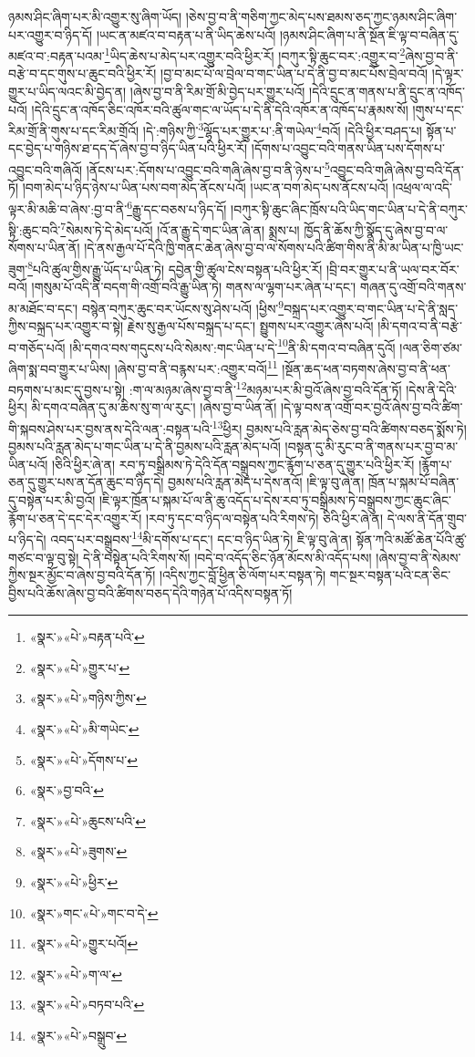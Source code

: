 ཉམས་ཤིང་ཞིག་པར་མི་འགྱུར་སུ་ཞིག་ཡོད། །ཅེས་བྱ་བ་ནི་གཅིག་ཀྱང་མེད་པས་ཐམས་ཅད་ཀྱང་ཉམས་ཤིང་ཞིག་པར་འགྱུར་བ་ཉིད་དོ། །ཡང་ན་མཛའ་བ་བརྟན་པ་ནི་ཡིད་ཆེས་པའོ། །ཉམས་ཤིང་ཞིག་པ་ནི་སྔོན་ཇི་ལྟ་བ་བཞིན་དུ་མཛའ་བ་:བརྟན་པའམ་\footnote{«སྣར་»«པེ་»བརྟན་པའི་}ཡིད་ཆེས་པ་མེད་པར་འགྱུར་བའི་ཕྱིར་རོ། །བཀུར་སྟི་ཆུང་བར་:འགྱུར་བ་\footnote{«སྣར་»«པེ་»གྱུར་པ་}ཞེས་བྱ་བ་ནི་བརྩེ་བ་དང་གུས་པ་ཆུང་བའི་ཕྱིར་རོ། །བྱ་བ་མང་པོ་ལ་བྲེལ་བ་གང་ཡིན་པ་དེ་ནི་བྱ་བ་མང་པོས་བྲེལ་བའོ། །དེ་ལྟར་གྱུར་པ་ཡིད་ལའང་མི་བྱེད་ན། །ཞེས་བྱ་བ་ནི་རིམ་གྲོ་མི་བྱེད་པར་གྱུར་པའོ། །དེའི་དྲུང་ན་གནས་པ་ནི་དྲུང་ན་འཁོད་པའོ། །དེའི་དྲུང་ན་འཁོད་ཅིང་འཁོར་བའི་ཚུལ་གང་ལ་ཡོད་པ་དེ་ནི་དེའི་འཁོར་ན་འཁོད་པ་རྣམས་སོ། །གུས་པ་དང་རིམ་གྲོ་ནི་གུས་པ་དང་རིམ་གྲོའོ། །དེ་:གཉིས་ཀྱི་\footnote{«སྣར་»«པེ་»གཉིས་ཀྱིས་}ལྷོད་པར་གྱུར་པ་:ནི་གཡེལ་\footnote{«སྣར་»«པེ་»མི་གཡེང་}བའོ། །དེའི་ཕྱིར་བཤད་པ། སྟོན་པ་དང་བྱེད་པ་གཉིས་ཐ་དད་དོ་ཞེས་བྱ་བ་ཉིད་ཡིན་པའི་ཕྱིར་རོ། །དོགས་པ་འབྱུང་བའི་གནས་ཡིན་པས་དོགས་པ་འབྱུང་བའི་གཞིའོ། །ནོངས་པར་:དོགས་པ་འབྱུང་བའི་གཞི་ཞེས་བྱ་བ་ནི་ཉེས་པ་\footnote{«སྣར་»«པེ་»དོགས་པ་}འབྱུང་བའི་གཞི་ཞེས་བྱ་བའི་དོན་ཏོ། །བག་མེད་པ་ཉིད་ཉེས་པ་ཡིན་པས་བག་མེད་ནོངས་པའོ། །ཡང་ན་བག་མེད་པས་ནོངས་པའོ། །འཕྲལ་ལ་འདི་ལྟར་མི་མཆི་བ་ཞེས་:བྱ་བ་ནི་\footnote{«སྣར་»བྱ་བའི་}རྒྱུ་དང་བཅས་པ་ཉིད་དོ། །བཀུར་སྟི་ཆུང་ཞིང་ཁྲོས་པའི་ཡིད་གང་ཡིན་པ་དེ་ནི་བཀུར་སྟི་:ཆུང་བའི་\footnote{«སྣར་»«པེ་»ཆུངས་པའི་}སེམས་ཏེ་དེ་མེད་པའོ། །འོ་ན་རྒྱུ་དེ་གང་ཡིན་ཞེ་ན། སྨྲས་པ། ཁྱོད་ནི་ཆོས་ཀྱི་སྣོད་དུ་ཞེས་བྱ་བ་ལ་སོགས་པ་ཡིན་ནོ། །དེ་ནས་རྒྱལ་པོ་དེའི་ཁྱི་གནང་ཆེན་ཞེས་བྱ་བ་ལ་སོགས་པའི་ཚིག་གིས་ནི་མི་མ་ཡིན་པ་ཁྱི་ཡང་ཟུག་\footnote{«སྣར་»«པེ་»ཟུགས་}པའི་ཚུལ་གྱིས་རྒྱུ་ཡོད་པ་ཡིན་ཏེ། དབྱེན་གྱི་ཚུལ་ངེས་བསྟན་པའི་ཕྱིར་རོ། །བྲི་བར་གྱུར་པ་ནི་ཡལ་བར་བོར་བའོ། །གསུམ་པོ་འདི་ནི་བདག་གི་འགྲོ་བའི་རྒྱུ་ཡིན་ཏེ། གནས་ལ་ལྷག་པར་ཞེན་པ་དང་། གཞན་དུ་འགྲོ་བའི་གནས་མ་མཐོང་བ་དང་། བསྙེན་བཀུར་ཆུང་བར་ཡོངས་སུ་ཤེས་པའོ། །ཕྱིས་\footnote{«སྣར་»«པེ་»ཕྱིར་}བསྐྲད་པར་འགྱུར་བ་གང་ཡིན་པ་དེ་ནི་སླད་ཀྱིས་བསྐྲད་པར་འགྱུར་བ་སྟེ། རྗེས་སུ་རྒྱལ་པོས་བསྐྲད་པ་དང་། སྤྱུགས་པར་འགྱུར་ཞེས་པའོ། །མི་དགའ་བ་ནི་བརྩེ་བ་གཅོད་པའོ། །མི་དགའ་བས་གདུངས་པའི་སེམས་:གང་ཡིན་པ་དེ་\footnote{«སྣར་»གང་«པེ་»གང་བ་དེ་}ནི་མི་དགའ་བ་བཞིན་དུའོ། །ལན་ཅིག་ཙམ་ཞིག་སྨ་བབ་གྱུར་པ་ཡིས། །ཞེས་བྱ་བ་ནི་བརྙས་པར་:འགྱུར་བའོ།\footnote{«སྣར་»«པེ་»གྱུར་པའོ།} །སྔོན་ཆད་ཕན་བཏགས་ཞེས་བྱ་བ་ནི་ཕན་བཏགས་པ་མང་དུ་བྱས་པ་སྟེ། :ག་ལ་མཉམ་ཞེས་བྱ་བ་ནི་\footnote{«སྣར་»«པེ་»ག་ལ་}མཉམ་པར་མི་བྱའོ་ཞེས་བྱ་བའི་དོན་ཏོ། །དེས་ནི་དེའི་ཕྱིར། མི་དགའ་བཞིན་དུ་མ་ཆིས་སུ་ག་ལ་རུང་། །ཞེས་བྱ་བ་ཡིན་ནོ། །དེ་ལྟ་བས་ན་འགྲོ་བར་བྱའོ་ཞེས་བྱ་བའི་ཚིག་གི་སྐབས་ཤེས་པར་བྱས་ནས་དེའི་ལན་:བསྟན་པའི་\footnote{«སྣར་»«པེ་»བཏབ་པའི་}ཕྱིར། བྱམས་པའི་རླན་མེད་ཅེས་བྱ་བའི་ཚིགས་བཅད་སྨོས་ཏེ། བྱམས་པའི་རླན་མེད་པ་གང་ཡིན་པ་དེ་ནི་བྱམས་པའི་རླན་མེད་པའོ། །བསྟན་དུ་མི་རུང་བ་ནི་གནས་པར་བྱ་བ་མ་ཡིན་པའོ། །ཅིའི་ཕྱིར་ཞེ་ན། རབ་ཏུ་བསྒྲིམས་ཏེ་དེའི་དོན་བསྒྲུབས་ཀྱང་རྙོག་པ་ཅན་དུ་གྱུར་པའི་ཕྱིར་རོ། །རྙོག་པ་ཅན་དུ་གྱུར་པས་ན་དོན་ཆུང་བ་ཉིད་དེ། བྱམས་པའི་རླན་མེད་པ་དེས་ནའོ། །ཇི་ལྟ་བུ་ཞེ་ན། ཁྲོན་པ་སྐམ་པོ་བཞིན་དུ་བསྟེན་པར་མི་བྱའོ། །ཇི་ལྟར་ཁྲོན་པ་སྐམ་པོ་ལ་ནི་ཆུ་འདོད་པ་དེས་རབ་ཏུ་བསྒྲིམས་ཏེ་བསྒྲུབས་ཀྱང་ཆུང་ཞིང་རྙོག་པ་ཅན་དེ་དང་དེར་འགྱུར་རོ། །རབ་ཏུ་དང་བ་ཉིད་ལ་བསྟེན་པའི་རིགས་ཏེ། ཅིའི་ཕྱིར་ཞེ་ན། དེ་ལས་ནི་དོན་གྲུབ་པ་ཉིད་དེ། འབད་པར་བསྒྲུབས་\footnote{«སྣར་»«པེ་»བསྒྲུབ་}མི་དགོས་པ་དང་། དང་བ་ཉིད་ཡིན་ཏེ། ཇི་ལྟ་བུ་ཞེ་ན། སྟོན་ཀའི་མཚོ་ཆེན་པོའི་ཚུ་གཙང་བ་ལྟ་བུ་སྟེ། དེ་ནི་བསྟེན་པའི་རིགས་སོ། །བདེ་བ་འདོད་ཅིང་ཉོན་མོངས་མི་འདོད་པས། །ཞེས་བྱ་བ་ནི་སེམས་ཀྱིས་སྔར་མྱོང་བ་ཞེས་བྱ་བའི་དོན་ཏོ། །འདིས་ཀྱང་བློ་ཕྱིན་ཅི་ལོག་པར་བསྟན་ཏེ། གང་སྔར་བསྟན་པའི་ངན་ཅིང་བྱིས་པའི་ཆོས་ཞེས་བྱ་བའི་ཚིགས་བཅད་དེའི་གཉེན་པོ་འདིས་བསྟན་ཏོ། 